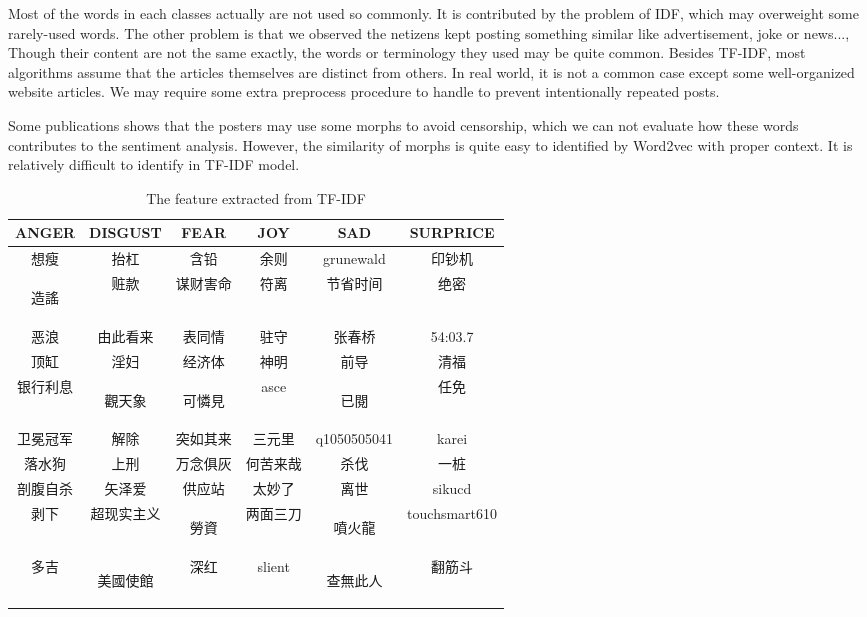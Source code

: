 Most of the words in each classes actually are not used so commonly. It is contributed by the problem of IDF, which may overweight some rarely-used words.
The other problem is that we observed the netizens kept posting something similar like advertisement, joke or news..., 
Though their content are not the same exactly, the words or terminology they used may be quite common. 
Besides TF-IDF, most algorithms assume that the articles themselves are distinct from others. In real world, it is not a common case except some well-organized website articles.
We may require some extra preprocess procedure to handle to prevent intentionally repeated posts.

Some publications\cite{Chen2013TUP25129382512940} shows that the posters may use some morphs to avoid censorship, which we can not evaluate how these words contributes to the sentiment analysis. 
However, the similarity of morphs is quite easy to identified by Word2vec with proper context. 
It is relatively difficult to identify in TF-IDF model. 
\begin{CJK}{UTF8}{gbsn}
\begin{table}[]
\centering
\caption{The feature extracted from TF-IDF}
\label{table:featureoftfidf}
\begin{tabular}{|c|c|c|c|c|c|}
ANGER	& DISGUST	& FEAR	& JOY	& SAD	& SURPRICE \\
\hline
想瘦	&抬杠	&含铅	&余则	&grunewald	&印钞机 \\
\begin{CJK}{UTF8}{bkai}造謠\end{CJK}	&赃款	&谋财害命	&符离	&节省时间	&绝密\\
恶浪	&由此看来	&表同情	&驻守	&张春桥	&54:03.7\\
顶缸	&淫妇	&经济体	&神明	&前导	&清福\\
银行利息	&\begin{CJK}{UTF8}{bkai}觀天象\end{CJK}	&\begin{CJK}{UTF8}{bkai}可憐見\end{CJK}	&asce	&\begin{CJK}{UTF8}{bkai}已閱\end{CJK}	&任免\\
卫冕冠军	&解除	&突如其来	&三元里	&q1050505041	&karei\\
落水狗	&上刑	&万念俱灰	&何苦来哉	&杀伐	&一桩\\
剖腹自杀	&矢泽爱	&供应站	&太妙了	&离世	&sikucd\\
剥下	&超现实主义	&\begin{CJK}{UTF8}{bkai}勞資\end{CJK}	&两面三刀	&\begin{CJK}{UTF8}{bkai}噴火龍\end{CJK}	&touchsmart610\\
多吉	&\begin{CJK}{UTF8}{bkai}美國使館\end{CJK}	&深红	&slient	&\begin{CJK}{UTF8}{bkai}查無此人\end{CJK}	&翻筋斗
\end{tabular}
\end{table}
\end{CJK}

